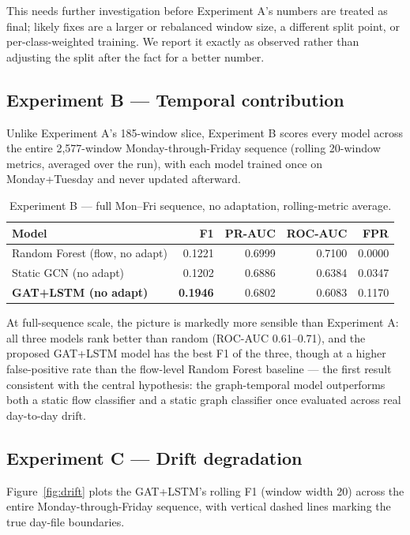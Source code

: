 \documentclass[twocolumn]{llncs}
\begin{document}
This needs further investigation before Experiment A's numbers are treated as final; likely fixes
are a larger or rebalanced window size, a different split point, or per-class-weighted training. We
report it exactly as observed rather than adjusting the split after the fact for a better number.

\subsection{Experiment B --- Temporal contribution}
\label{sec:expb}

Unlike Experiment A's 185-window slice, Experiment B scores every model across the entire
2{,}577-window Monday-through-Friday sequence (rolling 20-window metrics, averaged over the run),
with each model trained once on Monday+Tuesday and never updated afterward.

\begin{table}[t]
\centering
\caption{Experiment B --- full Mon--Fri sequence, no adaptation, rolling-metric average.}
\label{tab:expb}
\small
\begin{tabular}{|l|r|r|r|r|}
\hline
Model & F1 & PR-AUC & ROC-AUC & FPR \\
\hline
Random Forest (flow, no adapt) & 0.1221 & 0.6999 & 0.7100 & 0.0000 \\
Static GCN (no adapt)          & 0.1202 & 0.6886 & 0.6384 & 0.0347 \\
\textbf{GAT+LSTM (no adapt)}   & \textbf{0.1946} & 0.6802 & 0.6083 & 0.1170 \\
\hline
\end{tabular}
\end{table}

At full-sequence scale, the picture is markedly more sensible than Experiment A: all three models
rank better than random (ROC-AUC 0.61--0.71), and the proposed GAT+LSTM model has the best F1 of
the three, though at a higher false-positive rate than the flow-level Random Forest baseline ---
the first result consistent with the central hypothesis: the graph-temporal model outperforms both
a static flow classifier and a static graph classifier once evaluated across real day-to-day drift.

\subsection{Experiment C --- Drift degradation}
\label{sec:expc}

Figure~\ref{fig:drift} plots the GAT+LSTM's rolling F1 (window width 20) across the entire
Monday-through-Friday sequence, with vertical dashed lines marking the true day-file boundaries.
\end{document}
